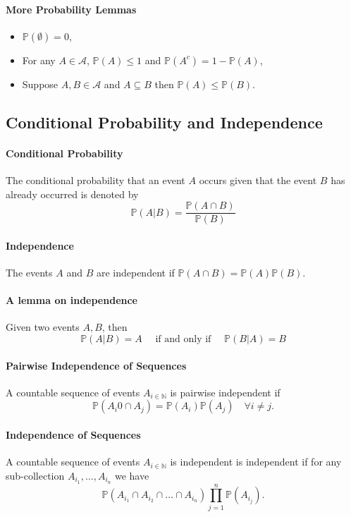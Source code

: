 \paragraph{More Probability Lemmas}
\begin{itemize}
    \item \(\mathbb{P} (\emptyset) = 0\),
    \item For any \(A\in\mathcal{A}\), \(\mathbb{P}(A) \leq 1\) and \(\mathbb{P}(A^c) = 1-\mathbb{P}(A)\),
    \item Suppose \(A, B\in\mathcal{A}\) and \(A\subseteq B\) then \(\mathbb{P}(A) \leq \mathbb{P}(B) \).
\end{itemize}

\subsection{Conditional Probability and Independence}

\paragraph{Conditional Probability}
The conditional probability that an event \(A\) occurs given that the event
\(B\) has already occurred is denoted by 
\[
    \mathbb{P} (A|B) = \frac{\mathbb{P} (A \cap B)}{\mathbb{P} (B)}
\]

\paragraph{Independence}
The events \(A\) and \(B\) are independent if
\(
    \mathbb{P}(A\cap B) = \mathbb{P}(A)\mathbb{P}(B).
\)

\paragraph{A lemma on independence}
Given two events \(A, B\), then 
\[
    \mathbb{P}(A | B) = A
    \quad \text{ if and only if } \quad
    \mathbb{P}(B | A) = B
\]

\paragraph{Pairwise Independence of Sequences}
A countable sequence of events \(A_{i\in\mathbb{N}}\) is pairwise independent
if  \[
    \mathbb{P}(A_i0 \cap A_j) = \mathbb{P} (A_i) \mathbb{P}(A_j) \quad
    \forall i\neq j.
\]

\paragraph{Independence of Sequences}
A countable sequence of events \(A_{i\in\mathbb{N}}\) is independent is
independent if for any sub-collection \(A_{i_1},\dots, A_{i_n}\) we have
\[
    \mathbb{P}(A_{i_1} \cap A_{i_2}\cap\dots\cap A_{i_n})
    \prod_{j=1}^{n} \mathbb{P}(A_{i_j}).
\]

